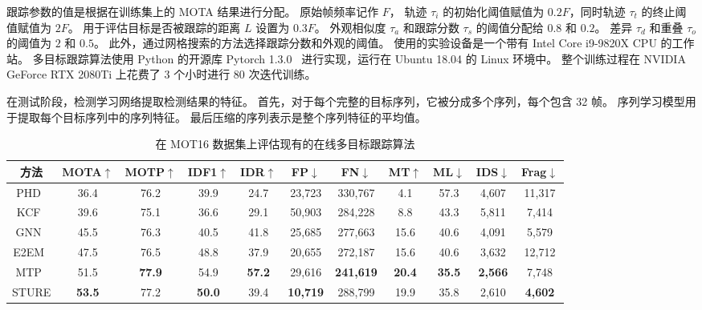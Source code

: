跟踪参数的值是根据在训练集上的 MOTA 结果进行分配。
原始帧频率记作 $ F $，
轨迹 $\tau_i$ 的初始化阈值赋值为 $0.2F$，同时轨迹 $\tau_t$ 的终止阈值赋值为 $2F$。
用于评估目标是否被跟踪的距离 $L$ 设置为 $0.3F$。
外观相似度 $\tau_a$ 和跟踪分数 $\tau_s$ 的阈值分配给 $0.8$ 和 $0.2$。
差异 $\tau_d$ 和重叠 $\tau_o$ 的阈值为 $2$ 和 $0.5$。
此外，通过网格搜索的方法选择跟踪分数和外观的阈值。
使用的实验设备是一个带有 Intel Core i9-9820X CPU 的工作站。
多目标跟踪算法使用 Python 的开源库 Pytorch 1.3.0~\cite{paszke2019pytorch} 进行实现，运行在 Ubuntu 18.04 的 Linux 环境中。
整个训练过程在 NVIDIA GeForce RTX 2080Ti 上花费了 3 个小时进行 80 次迭代训练。

在测试阶段，检测学习网络提取检测结果的特征。
首先，对于每个完整的目标序列，它被分成多个序列，每个包含 32 帧。
序列学习模型用于提取每个目标序列中的序列特征。
最后压缩的序列表示是整个序列特征的平均值。


\vspace{0.5em}
\renewcommand\arraystretch{1.5}
\begin{table}[htbp]\wuhao
	\centering
	\caption{在 MOT16 数据集上评估现有的在线多目标跟踪算法}
	\vspace{0.3em}
	\begin{tabular}{c|cccccccccc}
		\hline
		方法   & MOTA$ \uparrow $ & MOTP$ \uparrow $  & IDF1$ \uparrow $  & IDR$ \uparrow $ & FP$ \downarrow $  & FN$ \downarrow $  & MT$ \uparrow $  & ML$ \downarrow $  & IDS$ \downarrow $  & Frag$ \downarrow $\\ 
		\hline
		PHD~\cite{baisa2019online}   &36.4 &76.2 &39.9  &24.7 &23,723 &330,767 &4.1 & 57.3 &4,607 &11,317\\
		KCF~\cite{chen2017enhancing} &39.6 &75.1 &36.6 &29.1 &50,903 &284,228 &8.8 &43.3 &5,811 &7,414\\
		GNN~\cite{li2020graph}  &45.5 &76.3 &40.5 &41.8 &25,685 &277,663 &15.6 &40.6 &4,091 &5,579\\
		E2EM~\cite{kieritz2016online}    &47.5 &76.5 &48.8 &37.9 &20,655 &272,187 &15.6 &40.6 &3,632 &12,712\\
		MTP~\cite{kim2021discriminative}    &51.5 &\bfseries77.9 &54.9 &\bfseries57.2 &29,616 &\bfseries241,619 &\bfseries20.4 &\bfseries35.5 &\bfseries2,566 &7,748\\
		STURE    &\bfseries53.5 &77.2 &\bfseries50.0 &39.4 &\bfseries10,719 &288,799 &19.9 &35.8  &2,610 &\bfseries4,602\\
		\hline
	\end{tabular}
	\label{tab:sture_performance_MOT16}
\end{table}


